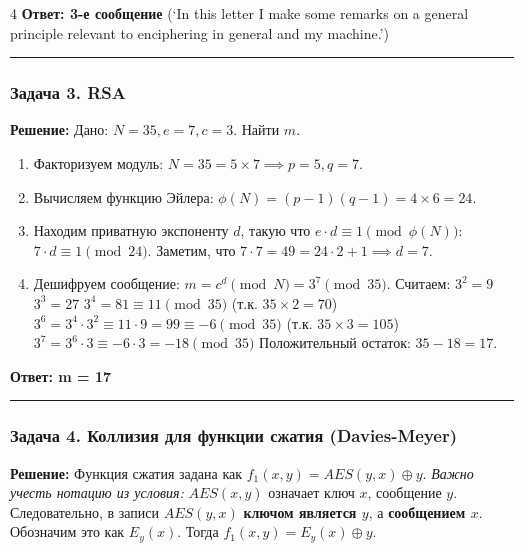﻿\documentclass[8pt,a4paper,landscape]{extarticle}
\newcommand{\tightlist}{}
\begin{document}
\begin{multicols*}{4}
\textbf{Ответ: 3-е сообщение} (`In this letter I make some remarks on a general principle relevant to enciphering in general and my machine.')

\begin{center}\rule{0.5\linewidth}{0.5pt}\end{center}

\subsubsection{Задача 3. RSA}\label{ux437ux430ux434ux430ux447ux430-3.-rsa}

\textbf{Решение:} Дано: \(N=35, e=7, c=3\). Найти \(m\).

\begin{enumerate}
\def\labelenumi{\arabic{enumi}.}
\tightlist
\item
  Факторизуем модуль: \(N = 35 = 5 \times 7 \implies p=5, q=7\).
\item
  Вычисляем функцию Эйлера: \(\phi(N) = (p-1)(q-1) = 4 \times 6 = 24\).
\item
  Находим приватную экспоненту \(d\), такую что \(e \cdot d \equiv 1 \pmod{\phi(N)}\): \(7 \cdot d \equiv 1 \pmod{24}\). Заметим, что \(7 \cdot 7 = 49 = 24 \cdot 2 + 1 \implies d = 7\).
\item
  Дешифруем сообщение: \(m = c^d \pmod N = 3^7 \pmod{35}\). Считаем: \(3^2 = 9\) \(3^3 = 27\) \(3^4 = 81 \equiv 11 \pmod{35}\) (т.к. \(35 \times 2 = 70\)) \(3^6 = 3^4 \cdot 3^2 \equiv 11 \cdot 9 = 99 \equiv -6 \pmod{35}\) (т.к. \(35 \times 3 = 105\)) \(3^7 = 3^6 \cdot 3 \equiv -6 \cdot 3 = -18 \pmod{35}\) Положительный остаток: \(35 - 18 = 17\).
\end{enumerate}

\textbf{Ответ: m = 17}

\begin{center}\rule{0.5\linewidth}{0.5pt}\end{center}

\subsubsection{Задача 4. Коллизия для функции сжатия (Davies-Meyer)}\label{ux437ux430ux434ux430ux447ux430-4.-ux43aux43eux43bux43bux438ux437ux438ux44f-ux434ux43bux44f-ux444ux443ux43dux43aux446ux438ux438-ux441ux436ux430ux442ux438ux44f-davies-meyer}

\textbf{Решение:} Функция сжатия задана как \(f_1(x,y) = AES(y,x) \oplus y\). \emph{Важно учесть нотацию из условия:} \(AES(x,y)\) означает ключ \(x\), сообщение \(y\). Следовательно, в записи \(AES(y,x)\) \textbf{ключом является \(y\)}, а \textbf{сообщением \(x\)}. Обозначим это как \(E_y(x)\). Тогда \(f_1(x,y) = E_y(x) \oplus y\).


\end{multicols*}
\end{document}
